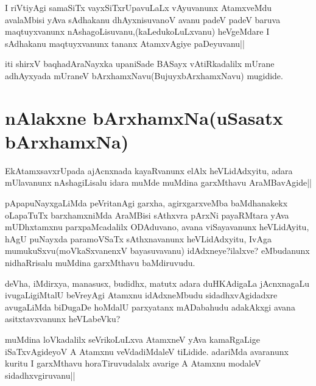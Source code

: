 
\begin{artha}
I riVtiyAgi samaSiTx vayxSiTxrUpavuLaLx vAyuvanunx AtamxveMdu avalaMbisi yAva sAdhakanu dhAyxnisuvanoV avanu padeV padeV baruva maqtuyxvanunx nAshagoLisuvanu,(kaLedukoLuLxvanu) heVgeMdare I sAdhakanu maqtuyxvanunx tananx AtamxvAgiye paDeyuvanu||
\end{artha}

\begin{center}
iti shirxV baqhadAraNayxka upaniSade BASayx vAtiRkadalilx mUrane adhAyxyada mUraneV bArxhamxNavu(BujuyxbArxhamxNavu) mugidide.
\end{center}

\section*{nAlakxne bArxhamxNa(uSasatx bArxhamxNa)}

\begin{artha}
EkAtamxsavxrUpada ajAcnxnada kayaRvanunx elAlx heVLidAdxyitu, adara mUlavanunx nAshagiLisalu idara muMde muMdina garxMthavu AraMBavAgide||
\end{artha}

\begin{artha}
pApapuNayxgaLiMda peVritanAgi garxha, agirxgarxveMba baMdhanakekx oLapaTuTx barxhamxniMda AraMBisi sAthxvra pArxNi payaRMtara yAva mUDhxtamxnu parxpaMcadalilx ODAduvano, avana viSayavanunx heVLidAyitu, hAgU puNayxda paramoVSaTx sAthxnavanunx heVLidAdxyitu, IvAga mumukuSxvu(moVkaSxvanenxV bayasuvavanu) idAdxneye?ilalxve? eMbudanunx nidhaRrisalu muMdina garxMthavu baMdiruvudu.
\end{artha}


\begin{artha}
deVha, iMdirxya, manasusx, budidhx, matutx adara duHKAdigaLa jAcnxnagaLu ivugaLigiMtalU beVreyAgi Atamxnu idAdxneMbudu sidadhxvAgidadxre avugaLiMda biDugaDe hoMdalU parxyatanx mADabahudu adakAkxgi avana asitxtavxvanunx heVLabeVku?
\end{artha}


\begin{artha}
muMdina loVkadalilx seVrikoLuLxva AtamxneV yAva kamaRgaLige iSaTxvAgideyoV A Atamxnu veVdadiMdaleV tiLidide. adariMda avaranunx kuritu I garxMthavu horaTiruvudalalx avarige A Atamxnu modaleV sidadhxvgiruvanu||
\end{artha}

